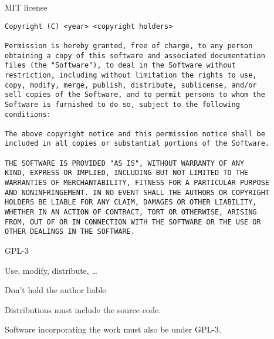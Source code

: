 \documentclass[12pt,t]{beamer}
\begin{document}
\begin{frame}[c,fragile]{MIT license}

\begin{lstlisting}
Copyright (C) <year> <copyright holders>

Permission is hereby granted, free of charge, to any person
obtaining a copy of this software and associated documentation
files (the "Software"), to deal in the Software without
restriction, including without limitation the rights to use,
copy, modify, merge, publish, distribute, sublicense, and/or
sell copies of the Software, and to permit persons to whom the
Software is furnished to do so, subject to the following
conditions:

The above copyright notice and this permission notice shall be
included in all copies or substantial portions of the Software.

THE SOFTWARE IS PROVIDED "AS IS", WITHOUT WARRANTY OF ANY
KIND, EXPRESS OR IMPLIED, INCLUDING BUT NOT LIMITED TO THE
WARRANTIES OF MERCHANTABILITY, FITNESS FOR A PARTICULAR PURPOSE
AND NONINFRINGEMENT. IN NO EVENT SHALL THE AUTHORS OR COPYRIGHT
HOLDERS BE LIABLE FOR ANY CLAIM, DAMAGES OR OTHER LIABILITY,
WHETHER IN AN ACTION OF CONTRACT, TORT OR OTHERWISE, ARISING
FROM, OUT OF OR IN CONNECTION WITH THE SOFTWARE OR THE USE OR
OTHER DEALINGS IN THE SOFTWARE.
\end{lstlisting}


\end{frame}


\begin{frame}{GPL-3}

\bbi
\item Use, modify, distribute, \dots
\item Don't hold the author liable.
\item Distributions must include the source code.
\item Software incorporating the work {\hilit must also be under GPL-3}.
\ei

\end{frame}
\end{document}
